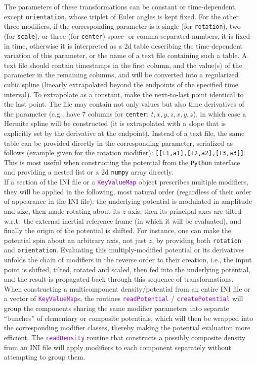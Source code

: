 \documentclass[12pt]{article}
\newcommand{\Python}{\texttt{Python}\xspace}
\newcommand{\ttt}[1]{\textcolor{darkviolet}{\texttt{#1}}}
\newcommand{\ppp}[1]{\textcolor{darkolive} {\texttt{#1}}}
\begin{document}
\begin{itemize}
The parameters of these transformations can be constant or time-dependent, except \ppp{orientation}, whose triplet of Euler angles is kept fixed. For the other three modifiers, if the corresponding parameter is a single (for \ppp{rotation}), two (for \ppp{scale}), or three (for \ppp{center}) space- or comma-separated numbers, it is fixed in time, otherwise it is interpreted as a 2d table describing the time-dependent variation of this parameter, or the name of a text file containing such a table. A text file should contain timestamps in the first column, and the value(s) of the parameter in the remaining columns, and will be converted into a regularized cubic spline (linearly extrapolated beyond the endpoints of the specified time interval). To extrapolate as a constant, make the next-to-last point identical to the last point. The file may contain not only values but also time derivatives of the parameter (e.g., have 7 columns for \ppp{center}: $t, x, y, z, \dot x, \dot y, \dot z$), in which case a Hermite spline will be constructed (it is extrapolated with a slope that is explicitly set by the derivative at the endpoint). Instead of a text file, the same table can be provided directly in the corresponding parameter, serialized as follows (example given for the rotation modifier): \texttt{[[t1,a1],[t2,a2],[t3,a3]]}. This is most useful when constructing the potential from the \Python interface and providing a nested list or a 2d \texttt{numpy} array directly.\\
%
If a section of the INI file or a \ttt{KeyValueMap} object prescribes multiple modifiers, they will be applied in the following, most natural order (regardless of their order of appearance in the INI file): the underlying potential is modulated in amplitude and size, then made rotating about its $z$ axis, then its principal axes are tilted w.r.t.\ the external inertial reference frame (in which it will be evaluated), and finally the origin of the potential is shifted. For instance, one can make the potential spin about an arbitrary axis, not just $z$, by providing both \ppp{rotation} and \ppp{orientation}. Evaluating this multiply-modified potential or its derivatives unfolds the chain of modifiers in the reverse order to their creation, i.e., the input point is shifted, tilted, rotated and scaled, then fed into the underlying potential, and the result is propagated back through this sequence of transformations.\\
%
When constructing a multicomponent density/potential from an entire INI file or a vector of \ttt{KeyValueMap}s, the routines \ttt{readPotential} / \ttt{createPotential} will group the components sharing the same modifier parameters into separate ``bunches'' of elementary or composite potentials, which will then be wrapped into the corresponding modifier classes, thereby making the potential evaluation more efficient. The \ttt{readDensity} routine that constructs a possibly composite density from an INI file will apply modifiers to each component separately without attempting to group them.\\

\end{itemize}
\end{document}
